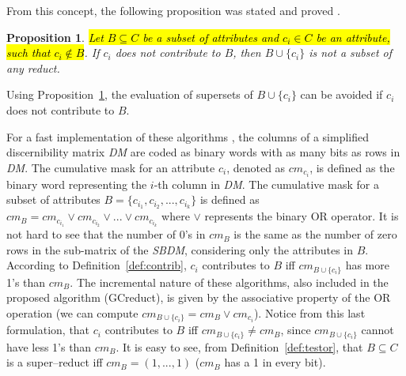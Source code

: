\documentclass[number,preprint,review,12pt]{elsarticle}
\newtheorem{proposition}{Proposition}
\newtheorem{corollary}{Corollary}
\begin{document}
	From this concept, the following proposition was stated and proved \cite{Sanchez07}.
			
	\begin{proposition}\label{prop:contrib} 
		\hl{Let $B \subseteq C$ be a subset of attributes and $c_i \in C$ be an attribute, such that $c_i \notin B$}. If $c_i$ does not contribute to $B$, then $B\cup\{c_i\}$ is not a subset of any reduct.
	\end{proposition}
	
	Using Proposition~\ref{prop:contrib}, the evaluation of supersets of $B\cup\{c_i\}$ can be avoided if $c_i$ does not contribute to $B$.
	
	
	For a fast implementation of these algorithms \citep{Sanchez10,Lias13}, the columns of a simplified discernibility matrix \textit{DM} are coded as binary words with as many bits as rows in \textit{DM}. The cumulative mask for an attribute $c_i$, denoted as $cm_{c_i}$, is defined as the binary word representing the $i$-th column in \textit{DM}. The cumulative mask for a subset of attributes $B=\lbrace c_{i_1},c_{i_2},...,c_{i_k} \rbrace$ is defined	as $cm_B = cm_{c_{i_1}} \vee cm_{c_{i_2}} \vee ... \vee cm_{c_{i_k}}$ where $\vee$ represents the binary OR operator. It is not hard to see that the number of 0's in $cm_B$ is the same as the number of zero rows in the sub-matrix of the \textit{SBDM}, considering only the attributes in $B$. According to Definition~\ref{def:contrib}, $c_i$ contributes to $B$ iff $cm_{B\cup \lbrace c_i\rbrace}$ has more 1's than $cm_B$. The incremental nature of these algorithms, also included in  the proposed algorithm (GCreduct), is given by the associative property of the OR operation (we can compute $cm_{B\cup \lbrace c_i\rbrace}=cm_B\vee cm_{c_i}$). Notice from this last formulation, that $c_i$ contributes to $B$ iff $cm_{B\cup \lbrace c_i\rbrace}\neq cm_B$, since $cm_{B\cup \lbrace c_i\rbrace}$ cannot have less 1's than $cm_B$. It is easy to see, from Definition~\ref{def:testor}, that $B \subseteq C$ is a super--reduct iff $cm_B=(1,...,1)$ ($cm_B$ has a 1 in every bit).
	
\end{document}
